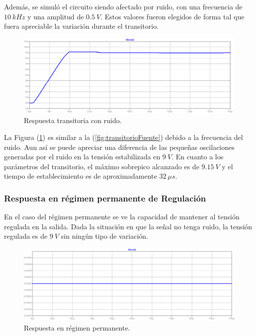 Además, se simuló el circuito siendo afectado por ruido, con una frecuencia de $10 \ kHz$ y una amplitud de $0.5 \ V$. Estos valores fueron elegidos de forma tal que fuera apreciable la variación  durante el transitorio.
\begin{figure}[H]
\centering
	\includegraphics[width=1\textwidth]{ImagenesEjercicio2/transrespnoise.png}
	\caption{Respuesta transitoria con ruido.}
	\label{fig:transitorioFuentenoise}
\end{figure}

La Figura (\ref{fig:transitorioFuentenoise}) es similar a la (\ref{fig:transitorioFuente}) debido a la frecuencia del ruido. Aun así se puede apreciar una diferencia de las pequeñas oscilaciones generadas por el ruido en la tensión estabilizada en $9 \ V$. En cuanto a los parámetros del transitorio, el máximo sobrepico alcanzado es de $9.15 \ V$ y el tiempo de establecimiento es de aproximadamente $32 \ \mu s$.

\subsubsection{Respuesta en régimen permanente de Regulación}
En el caso del régimen permanente se ve la capacidad de mantener al tensión regulada en la salida. Dada la situación en que la señal no tenga ruido, la tensión regulada es de $9 \ V$ sin ningún tipo de variación.
\begin{figure}[H]
\centering
	\includegraphics[width=1\textwidth]{ImagenesEjercicio2/permresp.png}
	\caption{Respuesta en régimen permanente.}
	\label{fig:permanenteFuente}
\end{figure}

